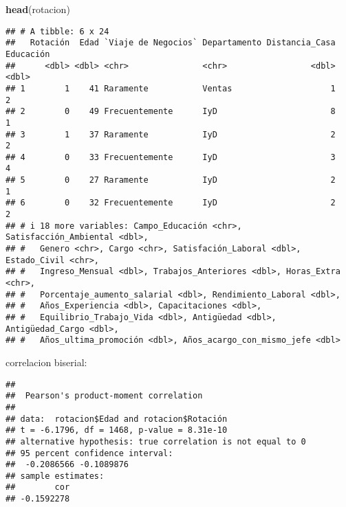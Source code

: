 \documentclass[
]{article}
\newenvironment{Shaded}{\begin{snugshade}}{\end{snugshade}}
\newcommand{\FunctionTok}[1]{\textcolor[rgb]{0.13,0.29,0.53}{\textbf{#1}}}
\newcommand{\NormalTok}[1]{#1}
\newcommand{\OtherTok}[1]{\textcolor[rgb]{0.56,0.35,0.01}{#1}}
\newcommand{\SpecialCharTok}[1]{\textcolor[rgb]{0.81,0.36,0.00}{\textbf{#1}}}
\begin{document}
\begin{Shaded}
\begin{Highlighting}[]
\FunctionTok{head}\NormalTok{(rotacion)}
\end{Highlighting}
\end{Shaded}

\begin{verbatim}
## # A tibble: 6 x 24
##   Rotación  Edad `Viaje de Negocios` Departamento Distancia_Casa Educación
##      <dbl> <dbl> <chr>               <chr>                 <dbl>     <dbl>
## 1        1    41 Raramente           Ventas                    1         2
## 2        0    49 Frecuentemente      IyD                       8         1
## 3        1    37 Raramente           IyD                       2         2
## 4        0    33 Frecuentemente      IyD                       3         4
## 5        0    27 Raramente           IyD                       2         1
## 6        0    32 Frecuentemente      IyD                       2         2
## # i 18 more variables: Campo_Educación <chr>, Satisfacción_Ambiental <dbl>,
## #   Genero <chr>, Cargo <chr>, Satisfación_Laboral <dbl>, Estado_Civil <chr>,
## #   Ingreso_Mensual <dbl>, Trabajos_Anteriores <dbl>, Horas_Extra <chr>,
## #   Porcentaje_aumento_salarial <dbl>, Rendimiento_Laboral <dbl>,
## #   Años_Experiencia <dbl>, Capacitaciones <dbl>,
## #   Equilibrio_Trabajo_Vida <dbl>, Antigüedad <dbl>, Antigüedad_Cargo <dbl>,
## #   Años_ultima_promoción <dbl>, Años_acargo_con_mismo_jefe <dbl>
\end{verbatim}

correlacion biserial:

\begin{Shaded}
\end{Shaded}

\begin{verbatim}
## 
##  Pearson's product-moment correlation
## 
## data:  rotacion$Edad and rotacion$Rotación
## t = -6.1796, df = 1468, p-value = 8.31e-10
## alternative hypothesis: true correlation is not equal to 0
## 95 percent confidence interval:
##  -0.2086566 -0.1089876
## sample estimates:
##        cor 
## -0.1592278
\end{verbatim}
\end{document}
